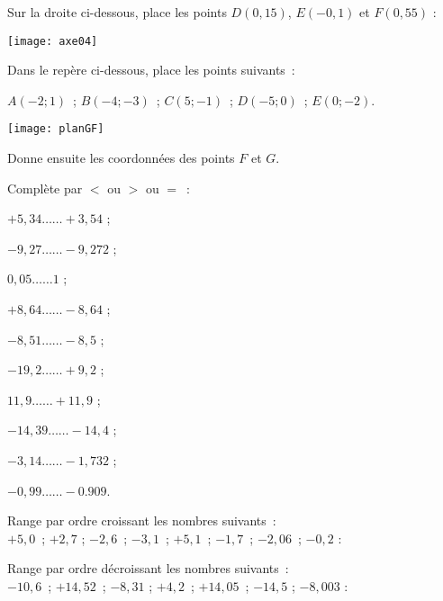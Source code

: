 \begin{exercice}
Sur la droite ci-dessous, place les points $D(0,15)$, $E(- 0,1)$ et $F(0,55)$ :
\begin{center} \texttt{[image: axe04]} \end{center}
\end{exercice}


\begin{exercice}
Dans le repère ci-dessous, place les points suivants : 

$A(- 2 ; 1)$ ; $B(- 4 ; - 3)$ ; $C(5 ; - 1)$ ; $D(- 5 ; 0)$ ; $E(0 ; - 2)$.
\begin{center} \texttt{[image: planGF]} \end{center}
Donne ensuite les coordonnées des points $F$ et $G$.
\end{exercice}


\begin{exercice}
Complète par $<$ ou $>$ ou $=$ :
\begin{colitemize}{2}
 \item $+ 5,34 \ldots \ldots + 3,54$ ;
 \item $- 9,27 \ldots \ldots - 9,272$ ;
 \item $0,05 \ldots \ldots 1$ ;
 \item $+ 8,64 \ldots \ldots - 8,64$ ;
 \item $- 8,51 \ldots \ldots - 8,5$ ;
 \item $- 19,2 \ldots \ldots + 9,2$ ;
 \item $11,9 \ldots \ldots +11,9$ ;
 \item $- 14,39 \ldots \ldots - 14,4$ ;
 \item $- 3,14 \ldots \ldots - 1,732$ ;
 \item $- 0,99 \ldots \ldots - 0.909$.
 \end{colitemize}
\end{exercice}


\begin{exercice}
Range par ordre croissant les nombres suivants : \\[0.5em]
$+ 5,0$ ; $+ 2,7$ ; $- 2,6$ ; $- 3,1$ ; $+ 5,1$ ; $- 1,7$ ; $- 2,06$ ; $- 0,2$ :

 \dotfill

 \dotfill
\end{exercice}


\begin{exercice}
Range par ordre décroissant les nombres suivants : \\[0.5em]
$- 10,6$ ; $+ 14,52$ ; $- 8,31$ ; $+ 4,2$ ; $+ 14,05$ ; $- 14,5$ ; $- 8,003$ :

 \dotfill

 \dotfill
\end{exercice}


